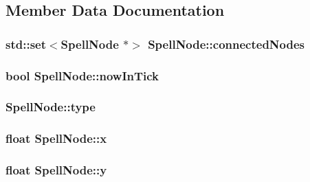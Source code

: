 \subsection{Member Data Documentation}
\hypertarget{class_spell_node_a5073f68f588de6227430cb0abe3e161a}{
\subsubsection[{connected\-Nodes}]{\setlength{\rightskip}{0pt plus 5cm}std\-::set$<${\bf Spell\-Node} $\ast$$>$ Spell\-Node\-::connected\-Nodes\hspace{0.3cm}{\ttfamily [protected]}}}\label{class_spell_node_a5073f68f588de6227430cb0abe3e161a}
\hypertarget{class_spell_node_a334bcdb7648ffd704510a6b277057fa5}{
\subsubsection[{now\-In\-Tick}]{\setlength{\rightskip}{0pt plus 5cm}bool Spell\-Node\-::now\-In\-Tick\hspace{0.3cm}{\ttfamily [protected]}}}\label{class_spell_node_a334bcdb7648ffd704510a6b277057fa5}
\hypertarget{class_spell_node_ae897f4f135608a9c71948b5f703aeb99}{
\subsubsection[{type}]{ Spell\-Node\-::type\hspace{0.3cm}{\ttfamily [protected]}}}\label{class_spell_node_ae897f4f135608a9c71948b5f703aeb99}
\hypertarget{class_spell_node_a916f2a709a674dd2a61530b6acc339cc}{
\subsubsection[{x}]{\setlength{\rightskip}{0pt plus 5cm}float Spell\-Node\-::x\hspace{0.3cm}{\ttfamily [protected]}}}\label{class_spell_node_a916f2a709a674dd2a61530b6acc339cc}
\hypertarget{class_spell_node_a754d80fd0fd82dbc12443b5f277b9fb4}{
\subsubsection[{y}]{\setlength{\rightskip}{0pt plus 5cm}float Spell\-Node\-::y\hspace{0.3cm}{\ttfamily [protected]}}}\label{class_spell_node_a754d80fd0fd82dbc12443b5f277b9fb4}
